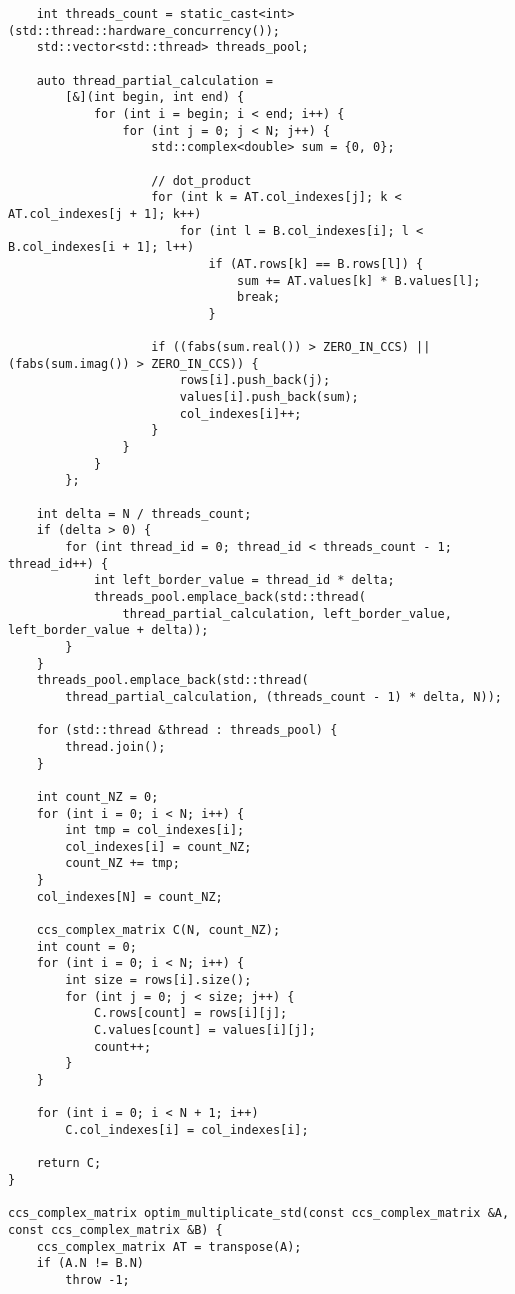 \documentclass{report}
\begin{document}
\begin{lstlisting}
    int threads_count = static_cast<int>(std::thread::hardware_concurrency());
    std::vector<std::thread> threads_pool;

    auto thread_partial_calculation =
        [&](int begin, int end) {
            for (int i = begin; i < end; i++) {
                for (int j = 0; j < N; j++) {
                    std::complex<double> sum = {0, 0};

                    // dot_product
                    for (int k = AT.col_indexes[j]; k < AT.col_indexes[j + 1]; k++)
                        for (int l = B.col_indexes[i]; l < B.col_indexes[i + 1]; l++)
                            if (AT.rows[k] == B.rows[l]) {
                                sum += AT.values[k] * B.values[l];
                                break;
                            }

                    if ((fabs(sum.real()) > ZERO_IN_CCS) || (fabs(sum.imag()) > ZERO_IN_CCS)) {
                        rows[i].push_back(j);
                        values[i].push_back(sum);
                        col_indexes[i]++;
                    }
                }
            }
        };

    int delta = N / threads_count;
    if (delta > 0) {
        for (int thread_id = 0; thread_id < threads_count - 1; thread_id++) {
            int left_border_value = thread_id * delta;
            threads_pool.emplace_back(std::thread(
                thread_partial_calculation, left_border_value, left_border_value + delta));
        }
    }
    threads_pool.emplace_back(std::thread(
        thread_partial_calculation, (threads_count - 1) * delta, N));

    for (std::thread &thread : threads_pool) {
        thread.join();
    }

    int count_NZ = 0;
    for (int i = 0; i < N; i++) {
        int tmp = col_indexes[i];
        col_indexes[i] = count_NZ;
        count_NZ += tmp;
    }
    col_indexes[N] = count_NZ;

    ccs_complex_matrix C(N, count_NZ);
    int count = 0;
    for (int i = 0; i < N; i++) {
        int size = rows[i].size();
        for (int j = 0; j < size; j++) {
            C.rows[count] = rows[i][j];
            C.values[count] = values[i][j];
            count++;
        }
    }

    for (int i = 0; i < N + 1; i++)
        C.col_indexes[i] = col_indexes[i];

    return C;
}

ccs_complex_matrix optim_multiplicate_std(const ccs_complex_matrix &A, const ccs_complex_matrix &B) {
    ccs_complex_matrix AT = transpose(A);
    if (A.N != B.N)
        throw -1;


\end{lstlisting}
\end{document}
